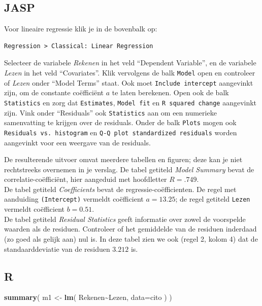 \documentclass[
]{book}
\newenvironment{Shaded}{\begin{snugshade}}{\end{snugshade}}
\newcommand{\DataTypeTok}[1]{\textcolor[rgb]{0.13,0.29,0.53}{#1}}
\newcommand{\KeywordTok}[1]{\textcolor[rgb]{0.13,0.29,0.53}{\textbf{#1}}}
\newcommand{\NormalTok}[1]{#1}
\newcommand{\OperatorTok}[1]{\textcolor[rgb]{0.81,0.36,0.00}{\textbf{#1}}}
\newcommand{\StringTok}[1]{\textcolor[rgb]{0.31,0.60,0.02}{#1}}
\begin{document}
\hypertarget{jasp-8}{%
\subsection{JASP}\label{jasp-8}}

Voor lineaire regressie klik je in de bovenbalk op:

\begin{verbatim}
Regression > Classical: Linear Regression
\end{verbatim}

Selecteer de variabele \emph{Rekenen} in het veld ``Dependent Variable'', en de variabele \emph{Lezen} in het veld ``Covariates''. Klik vervolgens de balk \texttt{Model} open en controleer of \emph{Lezen} onder ``Model Terms'' staat. Ook moet \texttt{Include\ intercept} aangevinkt zijn, om de constante coëfficiënt \(a\) te laten berekenen. Open ook de balk \texttt{Statistics} en zorg dat \texttt{Estimates}, \texttt{Model\ fit} en \texttt{R\ squared\ change} aangevinkt zijn. Vink onder ``Residuals'' ook \texttt{Statistics} aan om een numerieke samenvatting te krijgen over de residuals. Onder de balk \texttt{Plots} mogen ook \texttt{Residuals\ vs.\ histogram} en \texttt{Q-Q\ plot\ standardized\ residuals} worden aangevinkt voor een weergave van de residuals.

De resulterende uitvoer omvat meerdere tabellen en figuren; deze kan je
niet rechtstreeks overnemen in je verslag. De tabel getiteld \emph{Model
Summary} bevat de correlatie-coëfficiënt, hier aangeduid met hoofdletter
\(R=.749\).\\
De tabel getiteld \emph{Coefficients} bevat de regressie-coëfficienten. De
regel met aanduiding \texttt{(Intercept)} vermeldt coëfficient \(a=13.25\); de
regel getiteld \texttt{Lezen} vermeldt coëfficient \(b=0.51\).\\
De tabel getiteld \emph{Residual Statistics} geeft informatie over zowel de
voorspelde waarden als de residuen. Controleer of het gemiddelde van de
residuen inderdaad (zo goed als gelijk aan) nul is. In deze tabel zien we ook (regel 2, kolom 4)
dat de standaarddeviatie van de residuen \(3.212\) is.

\hypertarget{r-8}{%
\subsection{R}\label{r-8}}

\begin{Shaded}
\begin{Highlighting}[]
\KeywordTok{summary}\NormalTok{( m1 \textless{}{-}}\StringTok{ }\KeywordTok{lm}\NormalTok{( Rekenen}\OperatorTok{\textasciitilde{}}\NormalTok{Lezen, }\DataTypeTok{data=}\NormalTok{cito ) )}
\end{Highlighting}
\end{Shaded}
\end{document}
